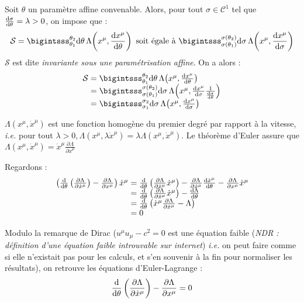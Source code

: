 Soit $\theta$ un paramètre affine convenable. Alors, pour tout $\sigma \in \mathcal{C}^1$ tel que $\frac{\mathrm{d}\sigma}{\mathrm{d}\theta}=\lambda>0$, on impose que :
$$
	\mathcal{S}=\bigintsss_{\theta_1}^{\theta_2}\dif\theta\,\Lambda\!\left(x^\mu,\frac{\dif x^\mu}{\dif\theta}\right) \text{ soit égale à } \bigintsss_{\sigma(\theta_1)}^{\sigma(\theta_2)}\dif\sigma\,\Lambda\!\left(x^\mu,\frac{\dif x^\mu}{\dif\sigma}\right) 
$$
$\mathcal{S}$ est dite \emph{invariante sous une paramétrisation affine}. On a alors :
$$
	\begin{array}{r@{\;}l}
		\mathcal{S}&=\bigintsss_{\theta_1}^{\theta_2}\dif\theta\,\Lambda\!\left(x^\mu,\frac{\dif x^\mu}{\dif\theta}\right)\\
			&=\bigintsss_{\sigma(\theta_1)}^{\sigma(\theta_2)}\dif\sigma\,\Lambda\!\left(x^\mu,\frac{\dif x^\mu}{\dif\sigma}\frac{1}{\frac{\dif\sigma}{\dif\theta}}\right)\\
			&=\bigintsss_{\sigma_1}^{\sigma_2}\dif\sigma\,\Lambda\!\left(x^\mu,\frac{\dif x^\mu}{\dif\sigma}\right)
	\end{array}
$$

{\txt $ \Lambda(x^\mu,\dot{x}^\mu)$ est une fonction homogène du premier degré par rapport à la vitesse, \emph{i.e.} pour tout $\lambda>0, \Lambda(x^\mu,\lambda\dot{x}^\mu)=\lambda\Lambda(x^\mu,\dot{x}^\mu)$.
Le théorème d'Euler assure que $\Lambda(x^\mu,\dot{x}^\mu)=\dot{x}^\mu\frac{\partial\Lambda}{\partial\dot{x}^\mu}$}

Regardons :
$$
	\begin{array}{l@{\;}l}
		\left(\frac{\dif}{\dif\theta}\left(\frac{\partial\Lambda}{\partial\dot{x}^\mu}\right)-\frac{\partial\Lambda}{\partial x^\mu}\right)\dot{x}^\mu&= \frac{\dif}{\dif \theta}\left(\frac{\partial\Lambda}{\partial\dot{x}^\mu}\dot{x}^\mu\right)-\frac{\partial \Lambda}{\partial \dot{x}^\mu}\frac{\dif \dot{x}^\mu}{\dif\theta}-\frac{\partial \Lambda}{\partial x^\mu}\dot{x}^\mu\\
			&=\frac{\dif}{\dif\theta}\left(\frac{\partial\Lambda}{\partial\dot{x}^\mu}\dot{x}^\mu\right)-\frac{\dif\Lambda}{\dif \theta}\\
			&=\frac{\dif}{\dif\theta}\left(\dot{x}^\mu\frac{\partial \Lambda}{\partial \dot{x}^\mu}-\Lambda\right)\\
			&=0
	\end{array}
$$

\begin{conc}
	Modulo la remarque de Dirac (\og  $u^\mu u_\mu-c^2=0$ est une équation faible \fg (\emph{NDR : définition d'une équation faible introuvable sur internet}) \emph{i.e.} on peut faire comme si elle n'existait pas pour les calculs, et s'en souvenir à la fin pour normaliser les résultats), on retrouve les équations d'Euler-Lagrange :
$$
	\frac{\mathrm{d}}{\mathrm{d} \theta}\left(\frac{\partial\Lambda}{\partial \dot{x}^\mu}\right)-\frac{\partial\Lambda}{\partial x^\mu}=0
$$
\end{conc}

